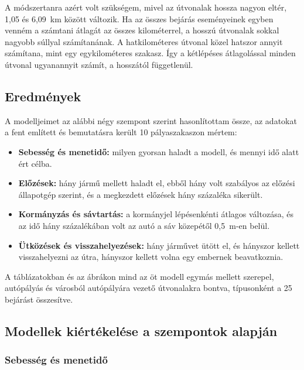 \documentclass[a4paper,12pt,oneside]{article}
\begin{document}
A módszertanra azért volt szükségem, mivel az útvonalak hossza nagyon eltér, 1,05 és 6,09~km
között változik. 
Ha az összes bejárás eseményeinek egyben venném a számtani átlagát az összes kilométerrel, a
hosszú útvonalak sokkal nagyobb súllyal számítanának. A hatkilométeres útvonal közel
hatszor annyit számítana, mint egy egykilométeres szakasz.
Így a kétlépéses átlagolással minden útvonal ugyanannyit számít, a hosszától
függetlenül.

\subsection{Eredmények}
\label{subsec:eval_results}

A modelljeimet az alábbi négy szempont szerint hasonlítottam össze, az adatokat a fent említett 
és bemutatásra került 10 pályaszakaszon mértem:
\begin{itemize}
  \item \textbf{Sebesség és menetidő:} milyen gyorsan haladt a modell, és mennyi idő alatt
  ért célba.
  \item \textbf{Előzések:} hány jármű mellett haladt el, ebből hány volt szabályos az
  előzési állapotgép szerint, és a megkezdett előzések hány százaléka sikerült.
  \item \textbf{Kormányzás és sávtartás:} a kormányjel lépésenkénti átlagos változása, és az
  idő hány százalékában volt az autó a sáv közepétől 0,5~m-en belül.
  \item \textbf{Ütközések és visszahelyezések:} hány járművet ütött el, és hányszor kellett
  visszahelyezni az útra, hányszor kellett volna egy embernek beavatkoznia.
\end{itemize}

A táblázatokban és az ábrákon mind az öt modell egymás mellett szerepel,
autópályás és városból autópályára vezető útvonalakra bontva, típusonként a 25 bejárást összesítve.

\subsection{Modellek kiértékelése a szempontok alapján}
\label{subsec:eval_discussion}

\subsubsection{Sebesség és menetidő}
\end{document}
